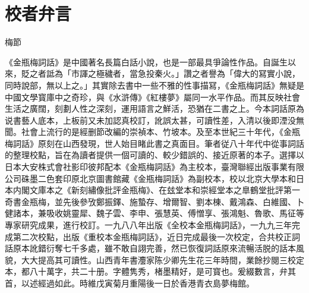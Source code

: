 \chapter*{校者弁言}

\begin{declareqianyan}
梅節\qquad\ 
\end{declareqianyan}

《金瓶梅詞話》是中國著名長篇白話小說，也是一部最具爭論性作品。自誕生以來，貶之者詆為「市諢之極穢者，當急投秦火。」讚之者譽為「偉大的冩實小說，同時說部，無以上之。」其實除去書中一些不雅的性事描冩，《金瓶梅詞話》無疑是中國文學寳庫中之奇珍，與《水滸傳》《紅樓夢》屬同一水平作品。而其反映社會生活之廣闊，刻劃人性之深刻，運用語言之鮮活，恐猶在二書之上。今本詞話原為说書藝人底本，上板前又未加認真校訂，訛誤太甚，可讀性差，入清以後即湮没無聞。社會上流行的是經删節改編的崇禎本、竹坡本。及至本世紀三十年代，《金瓶梅詞話》原刻在山西發現，世人始目睹此書之真面目。筆者従八十年代中從事詞話的整理校點，旨在為讀者提供一個可讀的、較少錯誤的、接近原著的本子。選擇以日本大安株式會社影印彼邦配本《金瓶梅詞話》為主校本，臺灣聯經出版事業有限公司硃墨二色套印原北京圖書館藏《金瓶梅詞話》為副校本，校以北京大學本和日本内閣文庫本之《新刻繡像批評金瓶梅》、在玆堂本和崇經堂本之臯鶴堂批評第一奇書金瓶梅，並先後參攷鄭振鐸、施蟄存、增爾智、劉本棟、戴鴻森、白維國、卜健諸本，兼吸收姚靈犀、魏子雲、李申、張慧英、傅憎享、張鴻魁、魯歌、馬征等專家研究成果，進行校訂。一九八八年出版《全校本金瓶梅詞話》，一九九三年完成第二次校點，出版《重校本金瓶梅詞話》，近日完成最後一次校定，合共校正詞話原本訛錯衍奪七千多處，雖不敢自詡完善，然已恢復詞話原來流暢活脱的話本風貌，大大提高其可讀性。山西青年書灋家陈少卿先生花三年時間，業餘抄閱三校定本，都八十萬字，共二十册。字體隽秀，楮墨精好，是可寳也。爰綴數言，弁其首，以述經過如此。時維戊寅菊月重陽後一日於香港青衣島夢梅館。

